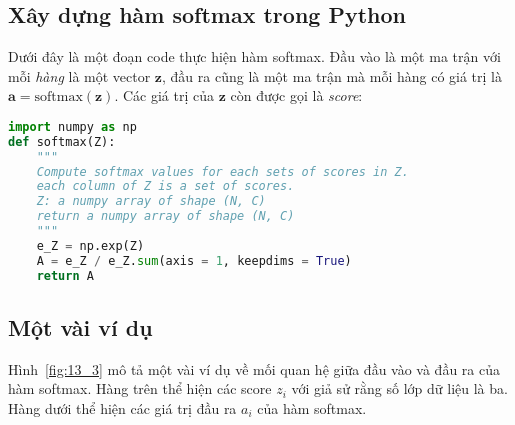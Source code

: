  
 
 
 
\subsection{Xây dựng hàm softmax trong Python }
Dưới đây là một đoạn code thực hiện hàm softmax. Đầu vào là một ma trận với mỗi
\textit{hàng} là một vector $\mathbf{z}$, đầu ra cũng là một ma trận mà mỗi hàng có
giá
trị là $\mathbf{a} = \text{softmax}(\mathbf{z})$. Các giá trị của $\mathbf{z}$ còn được gọi là \textit{score}:
 
\begin{lstlisting}[language=Python]
import numpy as np  
def softmax(Z):
    """
    Compute softmax values for each sets of scores in Z.
    each column of Z is a set of scores.    
    Z: a numpy array of shape (N, C)
    return a numpy array of shape (N, C)
    """
    e_Z = np.exp(Z)
    A = e_Z / e_Z.sum(axis = 1, keepdims = True)
    return A
\end{lstlisting}
 
 
\subsection{Một vài ví dụ }
 
Hình~\ref{fig:13_3} mô tả một vài ví dụ về mối quan hệ giữa đầu vào và đầu ra
của hàm softmax. Hàng trên thể hiện các score $z_i$ với giả sử rằng số lớp dữ
liệu là ba. Hàng dưới thể hiện các giá trị đầu ra $a_i$ của hàm softmax.
 

